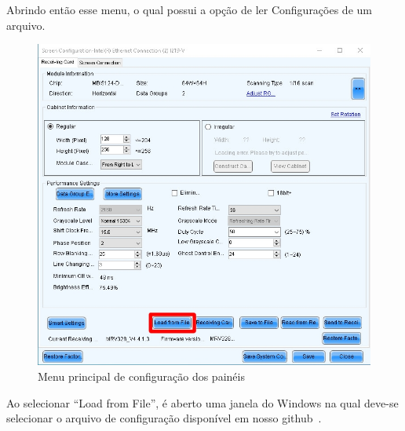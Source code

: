 \documentclass[12pt, a4paper]{article}
\begin{document}
\newpage
Abrindo então esse menu, o qual possui a opção de ler Configurações de um arquivo.
\begin{figure}[!htb]
	\centering
	\includegraphics[width=\textwidth]{SC1.jpeg}
	\caption{\label{fig:SC1.jpeg}Menu principal de configuração dos painéis}
\end{figure}

Ao selecionar ``Load from File'', é aberto uma janela do Windows na qual deve-se selecionar o arquivo de configuração disponível em nosso github~\cite{arquivoConfig}.
\end{document}
